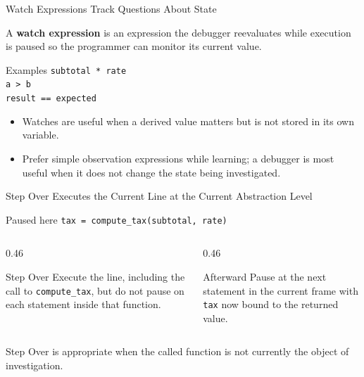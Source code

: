 \documentclass[aspectratio=169,10pt]{beamer}
\begin{document}
\begin{frame}{Watch Expressions Track Questions About State}
  \begin{cpdefinition}
    A \textbf{watch expression} is an expression the debugger reevaluates while execution is paused so the programmer can monitor its current value.
  \end{cpdefinition}

  \begin{block}{Examples}
    \texttt{subtotal * rate}\\
    \texttt{a > b}\\
    \texttt{result == expected}
  \end{block}

  \begin{itemize}
    \item Watches are useful when a derived value matters but is not stored in its own variable.
    \item Prefer simple observation expressions while learning; a debugger is most useful when it does not change the state being investigated.
  \end{itemize}
\end{frame}

\begin{frame}{Step Over Executes the Current Line at the Current Abstraction Level}
  \begin{block}{Paused here}
    \texttt{tax = compute\_tax(subtotal, rate)}
  \end{block}

  \begin{columns}[T,onlytextwidth]
    \begin{column}{0.46\textwidth}
      \begin{block}{Step Over}
        Execute the line, including the call to \texttt{compute\_tax}, but do not pause on each statement inside that function.
      \end{block}
    \end{column}

    \begin{column}{0.46\textwidth}
      \begin{block}{Afterward}
        Pause at the next statement in the current frame with \texttt{tax} now bound to the returned value.
      \end{block}
    \end{column}
  \end{columns}

  \begin{keyidea}
    Step Over is appropriate when the called function is not currently the object of investigation.
  \end{keyidea}
\end{frame}
\end{document}
